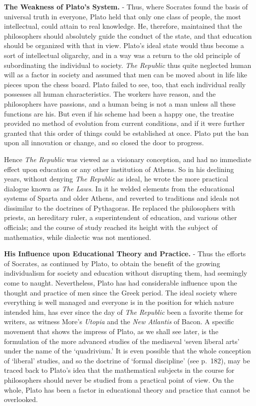 \documentclass[
]{book}
\begin{document}
\textbf{The Weakness of Plato's System.} - Thus, where Socrates found the basis of universal truth in everyone, Plato held that only one class of people, the most intellectual, could attain to real knowledge. He, therefore, maintained that the philosophers should absolutely guide the conduct of the state, and that education should be organized with that in view. Plato's ideal state would thus become a sort of intellectual oligarchy, and in a way was a return to the old principle of subordinating the individual to society. \emph{The Republic} thus quite neglected human will as a factor in society and assumed that men can be moved about in life like pieces upon the chess board. Plato failed to see, too, that each individual really possesses all human characteristics. The workers have reason, and the philosophers have passions, and a human being is not a man unless all these functions are his. But even if his scheme had been a happy one, the treatise provided no method of evolution from current conditions, and if it were further granted that this order of things could be established at once. Plato put the ban upon all innovation or change, and so closed the door to progress.

Hence \emph{The Republic} was viewed as a visionary conception, and had no immediate effect upon education or any other institution of Athens. So in his declining years, without denying \emph{The Republic} as ideal, he wrote the more practical dialogue known as \emph{The Laws.} In it he welded elements from the educational systems of Sparta and older Athens, and reverted to traditions and ideals not dissimilar to the doctrines of Pythagoras. He replaced the philosophers with priests, an hereditary ruler, a superintendent of education, and various other officials; and the course of study reached its height with the subject of mathematics, while dialectic was not mentioned.

\textbf{His Influence upon Educational Theory and Practice.} - Thus the efforts of Socrates, as continued by Plato, to obtain the benefit of the growing individualism for society and education without disrupting them, had seemingly come to naught. Nevertheless, Plato has had considerable influence upon the thought and practice of men since the Greek period. The ideal society where everything is well managed and everyone is in the position for which nature intended him, has ever since the day of \emph{The Republic} been a favorite theme for writers, as witness More's \emph{Utopia} and the \emph{New Atlantis} of Bacon. A specific movement that shows the impress of Plato, as we shall see later, is the formulation of the more advanced studies of the mediaeval `seven liberal arts' under the name of the `quadrivium.' It is even possible that the whole conception of `liberal' studies, and so the doctrine of `formal discipline' (see p.~182), may be traced back to Plato's idea that the mathematical subjects in the course for philosophers should never be studied from a practical point of view. On the whole, Plato has been a factor in educational theory and practice that cannot be overlooked.
\end{document}
